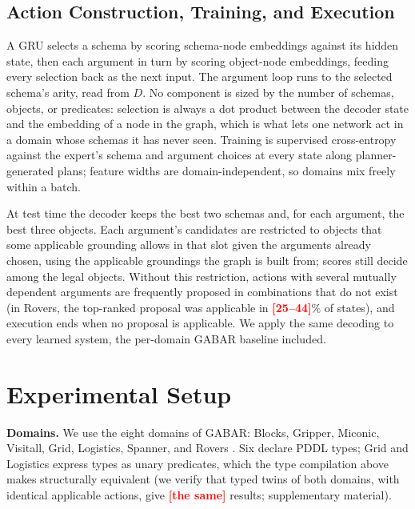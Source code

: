 \documentclass[letterpaper]{article} %
\newcommand{\todonum}[1]{\textcolor{red}{\textbf{[#1]}}}
\begin{document}
\subsection{Action Construction, Training, and Execution}

A GRU selects a schema by scoring schema-node embeddings against its hidden
state, then each argument in turn by scoring object-node embeddings, feeding
every selection back as the next input. The argument loop runs to the
selected schema's arity, read from $D$. No component is sized by the number
of schemas, objects, or predicates: selection is always a dot product
between the decoder state and the embedding of a node in the graph, which is
what lets one network act in a domain whose schemas it has never seen.
Training is supervised cross-entropy against the expert's schema and
argument choices at every state along planner-generated plans; feature
widths are domain-independent, so domains mix freely within a batch.

At test time the decoder keeps the best two schemas and, for each argument,
the best three objects. Each argument's candidates are restricted to
objects that some applicable grounding allows in that slot given the
arguments already chosen, using the applicable groundings the graph is
built from; scores still decide among the legal objects. Without this
restriction, actions with several mutually dependent arguments are
frequently proposed in combinations that do not exist (in Rovers, the
top-ranked proposal was applicable in \todonum{25--44}\% of states), and
execution ends when no proposal is applicable. We apply the same decoding to
every learned system, the per-domain GABAR baseline included.

\section{Experimental Setup}

\textbf{Domains.} We use the eight domains of GABAR: Blocks, Gripper,
Miconic, Visitall, Grid, Logistics, Spanner, and Rovers \citep{gabar,
pddl-generators}. Six declare PDDL types; Grid and Logistics express types
as unary predicates, which the type compilation above makes structurally
equivalent (we verify that typed twins of both domains, with identical
applicable actions, give \todonum{the same} results; supplementary material).
\end{document}
